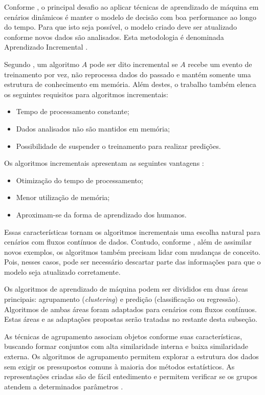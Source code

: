 \documentclass[qual, classic, a4paper]{ufbathesis}
\begin{document}
Conforme \cite{Gama:Rodrigues:2009}, o principal desafio ao aplicar técnicas de aprendizado de máquina em cenários dinâmicos é manter o modelo de decisão com boa performance ao longo do tempo.
Para que isto seja possível, o modelo criado deve ser atualizado conforme novos dados são analisados.
Esta metodologia é denominada Aprendizado Incremental \cite{Gama:2014:SCD:2597757.2523813}.

Segundo \cite{Langley:reimann1995learning}, um algoritmo $A$ pode ser dito incremental se $A$ recebe um evento de treinamento por vez,
não reprocessa dados do passado e mantém somente uma estrutura de conhecimento em memória. 
Além destes, o trabalho também elenca os seguintes requisitos para algoritmos incrementais:

\begin{itemize}
    \item Tempo de processamento constante;
    \item Dados analisados não são mantidos em memória;
    \item Possibilidade de suspender o treinamento para realizar predições.
\end{itemize}

Os algoritmos incrementais apresentam as seguintes vantagens \cite{pinto2005algoritmos}:

\begin{itemize}
    \item Otimização do tempo de processamento;
    \item Menor utilização de memória;
    \item Aproximam-se da forma de aprendizado dos humanos.
\end{itemize}

Essas características tornam os algoritmos incrementais uma escolha natural para cenários com fluxos contínuos de dados.
Contudo, conforme \cite{GamaMCR04}, além de assimilar novos exemplos, os algoritmos também precisam lidar com mudanças de conceito.
Pois, nesses casos, pode ser necessário descartar parte das informações para que o modelo seja atualizado corretamente.

Os algoritmos de aprendizado de máquina podem ser divididos em duas áreas principais: agrupamento (\textit{clustering}) e predição (classificação ou regressão).
Algoritmos de ambas áreas foram adaptados para cenários com fluxos contínuos.
Estas áreas e as adaptações propostas serão tratadas no restante desta subseção.

As técnicas de agrupamento associam objetos conforme suas características, buscando formar conjuntos com alta similaridade interna e baixa similaridade externa.
Os algoritmos de agrupamento permitem explorar a estrutura dos dados sem exigir os pressupostos comuns à maioria dos métodos estatísticos.
As representações criadas são de fácil entedimento e permitem verificar se os grupos atendem a determinados parâmetros \cite{Jain:1988:ACD:46712}.
\end{document}
